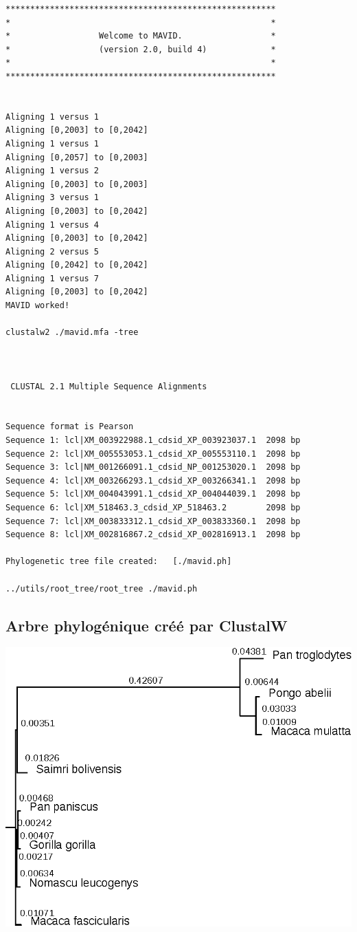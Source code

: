 \documentclass[11pt]{article} %
\begin{document}
\begin{verbatim}
*******************************************************
*                                                     *
*                  Welcome to MAVID.                  *
*                  (version 2.0, build 4)             *
*                                                     *
*******************************************************


Aligning 1 versus 1
Aligning [0,2003] to [0,2042]
Aligning 1 versus 1
Aligning [0,2057] to [0,2003]
Aligning 1 versus 2
Aligning [0,2003] to [0,2003]
Aligning 3 versus 1
Aligning [0,2003] to [0,2042]
Aligning 1 versus 4
Aligning [0,2003] to [0,2042]
Aligning 2 versus 5
Aligning [0,2042] to [0,2042]
Aligning 1 versus 7
Aligning [0,2003] to [0,2042]
MAVID worked!

clustalw2 ./mavid.mfa -tree



 CLUSTAL 2.1 Multiple Sequence Alignments


Sequence format is Pearson
Sequence 1: lcl|XM_003922988.1_cdsid_XP_003923037.1  2098 bp
Sequence 2: lcl|XM_005553053.1_cdsid_XP_005553110.1  2098 bp
Sequence 3: lcl|NM_001266091.1_cdsid_NP_001253020.1  2098 bp
Sequence 4: lcl|XM_003266293.1_cdsid_XP_003266341.1  2098 bp
Sequence 5: lcl|XM_004043991.1_cdsid_XP_004044039.1  2098 bp
Sequence 6: lcl|XM_518463.3_cdsid_XP_518463.2        2098 bp
Sequence 7: lcl|XM_003833312.1_cdsid_XP_003833360.1  2098 bp
Sequence 8: lcl|XM_002816867.2_cdsid_XP_002816913.1  2098 bp

Phylogenetic tree file created:   [./mavid.ph]

../utils/root_tree/root_tree ./mavid.ph
\end{verbatim}

\subsection{Arbre phylogénique créé par ClustalW}\label{20}
\includegraphics{annexes/q4_cds/clustalw/foxp4_ortho.eps}
\end{document}
